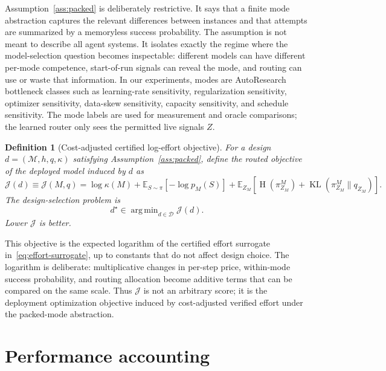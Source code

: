 \documentclass{article}
\newtheorem{definition}{Definition}
\DeclareMathOperator*{\argmin}{arg\,min}
\DeclareMathOperator{\KL}{KL}
\DeclareMathOperator{\Hent}{H}
\newcommand{\cD}{\mathcal{D}}
\newcommand{\E}{\mathbb{E}}
\newcommand{\J}{\mathcal{J}}
\begin{document}
Assumption~\ref{ass:packed} is deliberately restrictive.
It says that a finite mode abstraction captures the relevant differences between instances and that attempts are summarized by a memoryless success probability.
The assumption is not meant to describe all agent systems.
It isolates exactly the regime where the model-selection question becomes inspectable: different models can have different per-mode competence, start-of-run signals can reveal the mode, and routing can use or waste that information.
In our experiments, modes are AutoResearch bottleneck classes such as learning-rate sensitivity, regularization sensitivity, optimizer sensitivity, data-skew sensitivity, capacity sensitivity, and schedule sensitivity.
The mode labels are used for measurement and oracle comparisons; the learned router only sees the permitted live signals $Z$.

\begin{definition}[Cost-adjusted certified log-effort objective]
\label{def:objective}
For a design $d=(\mathcal M,h,q,\kappa)$ satisfying Assumption~\ref{ass:packed}, define the routed objective of the deployed model induced by $d$ as
\begin{equation}
  \J(d)\equiv \J(M,q)
  =
  \log \kappa(M)
  + \E_{S\sim\pi}[-\log p_M(S)]
  + \E_{Z_M}\!\left[
      \Hent(\pi_{Z_M}^M) +
      \KL(\pi_{Z_M}^M\|q_{Z_M})
    \right].
  \label{eq:objective}
\end{equation}
The design-selection problem is
\begin{equation}
  d^\star\in\argmin_{d\in\cD}\J(d).
  \label{eq:design-selection}
\end{equation}
Lower $\J$ is better.
\end{definition}

This objective is the expected logarithm of the certified effort surrogate in~\eqref{eq:effort-surrogate}, up to constants that do not affect design choice.
The logarithm is deliberate: multiplicative changes in per-step price, within-mode success probability, and routing allocation become additive terms that can be compared on the same scale.
Thus $\J$ is not an arbitrary score; it is the deployment optimization objective induced by cost-adjusted verified effort under the packed-mode abstraction.

\section{Performance accounting}
\label{sec:accounting}
\end{document}
